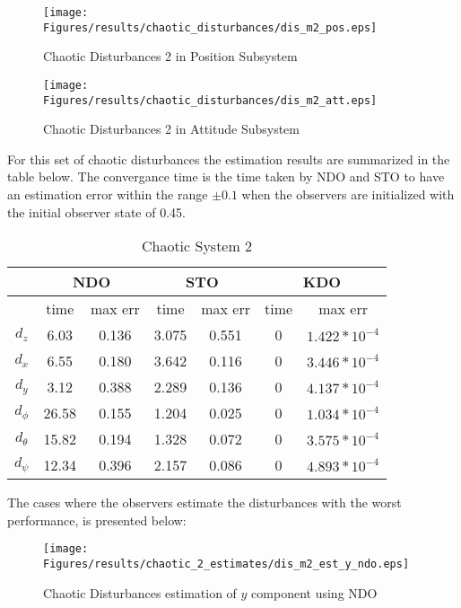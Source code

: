 \documentclass{article}
\begin{document}
\begin{figure}[H]
\centering
\texttt{[image: Figures/results/chaotic\_disturbances/dis\_m2\_pos.eps]}
\caption{Chaotic Disturbances 2 in Position Subsystem}
\label{dis_m2_pos}
\end{figure}

\begin{figure}[H]
\centering
\texttt{[image: Figures/results/chaotic\_disturbances/dis\_m2\_att.eps]}
\caption{Chaotic Disturbances 2 in Attitude Subsystem}
\label{dis_m2_att}
\end{figure}

For this set of chaotic disturbances the estimation results are summarized in the table below. The convergance time is the time taken by NDO and STO to have an estimation error within the range $\pm0.1$ when the observers are initialized with the initial observer state of 0.45. 

\begin{table}[!htbp]
\centering
\caption{Chaotic System 2}
\begin{tabular}{*7c}
\toprule
{}  &  \multicolumn{2}{c}{NDO} & \multicolumn{2}{c}{STO} & \multicolumn{2}{c}{KDO}\\
\midrule
{}        &   time  & max err  & time  & max err& time  & max err\\
$d_z$     &  6.03 & 0.136   & 3.075  & 0.551 & 0     & $1.422*10^{-4}$\\
$d_x$     &  6.55 & 0.180   & 3.642  & 0.116 & 0     & $3.446*10^{-4}$\\
$d_y$     &  3.12 & 0.388   & 2.289  & 0.136 & 0     & $4.137*10^{-4}$\\
$d_\phi$  &  26.58& 0.155   & 1.204  & 0.025 & 0     & $1.034*10^{-4}$\\
$d_\theta$&  15.82& 0.194   & 1.328  & 0.072 & 0     & $3.575*10^{-4}$\\
$d_\psi$  &  12.34& 0.396   & 2.157  & 0.086 & 0     & $4.893*10^{-4}$\\

\bottomrule
\end{tabular}
\end{table}

The cases where the observers estimate the disturbances with the worst performance, is presented below:

\begin{figure}[H]
\centering
\texttt{[image: Figures/results/chaotic\_2\_estimates/dis\_m2\_est\_y\_ndo.eps]}
\caption{Chaotic Disturbances estimation of $y$ component using NDO}
\label{dis_m2_est_y_ndo}
\end{figure}
\end{document}
